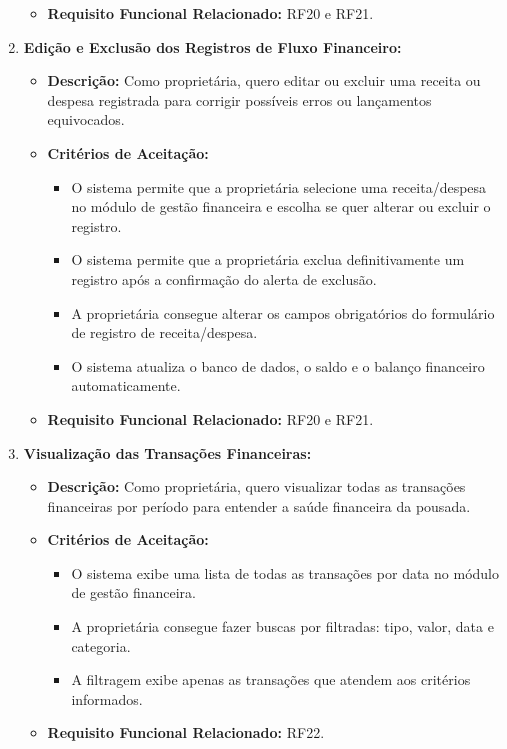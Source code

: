 \documentclass[
	12pt,				%
	openany,			%
	oneside,			%
	a4paper,			%
	english,			%
	french,				%
	spanish,			%
	brazil				%
	]{abntex2}
\begin{document}
\begin{enumerate}[label=\textbf{\arabic*.}]
\begin{itemize}
\begin{itemize}
		\end{itemize}
		\item \textbf{Requisito Funcional Relacionado:} RF20 e RF21.
	\end{itemize} 
	\item \textbf{Edição e Exclusão dos Registros de Fluxo Financeiro:}
	\begin{itemize}
		\item \textbf{Descrição:} Como proprietária, quero editar ou excluir uma receita ou despesa registrada para corrigir possíveis erros ou lançamentos equivocados.
		\item \textbf{Critérios de Aceitação:}
		\begin{itemize}
			\item O sistema permite que a proprietária selecione uma receita/despesa no módulo de gestão financeira e escolha se quer alterar ou excluir o registro.
			\item O sistema permite que a proprietária exclua definitivamente um registro após a confirmação do alerta de exclusão.
			\item A proprietária consegue alterar os campos obrigatórios do formulário de registro de receita/despesa.
			\item O sistema atualiza o banco de dados, o saldo e o balanço financeiro automaticamente. 
		\end{itemize}
		\item \textbf{Requisito Funcional Relacionado:} RF20 e RF21.
	\end{itemize} 
	\item \textbf{Visualização das Transações Financeiras:}
	\begin{itemize}
		\item \textbf{Descrição:} Como proprietária, quero visualizar todas as transações financeiras por período para entender a saúde financeira da pousada.
		\item \textbf{Critérios de Aceitação:}
		\begin{itemize}
			\item O sistema exibe uma lista de todas as transações por data no módulo de gestão financeira.
			\item A proprietária consegue fazer buscas por filtradas: tipo, valor, data e categoria.
			\item A filtragem exibe apenas as transações que atendem aos critérios informados.
		\end{itemize}
		\item \textbf{Requisito Funcional Relacionado:} RF22.

\end{itemize}
\end{enumerate}
\end{document}

